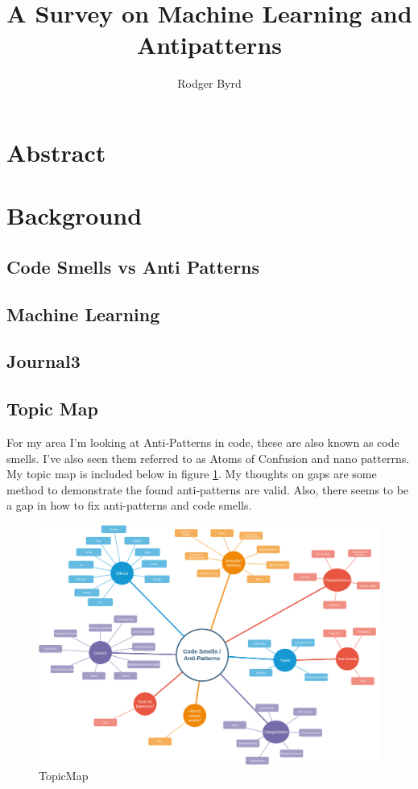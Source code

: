 \documentclass[conference]{IEEEtran}
\begin{document}

\title{A Survey on Machine Learning and Antipatterns}
\author{Rodger Byrd}
\maketitle

\section{Abstract}
\section{Background}
\subsection{Code Smells vs Anti Patterns}
\subsection{Machine Learning}

\subsection{Journal3}
\subsection{Topic Map}
For my area I'm looking at Anti-Patterns in code, these are also known as code smells. I've also seen them referred to as Atoms of Confusion and nano patterrns. My topic map is included below in figure \ref{fig:TM}. My thoughts on gaps are some method to demonstrate the found anti-patterns are valid. Also, there seems to be a gap in how to fix anti-patterns and code smells. 
\begin{figure}
  \centerline{\includegraphics[width=\textwidth]{codesmells.png}}
  \caption{TopicMap}
  \label{fig:TM}
\end{figure} 
\end{document}
